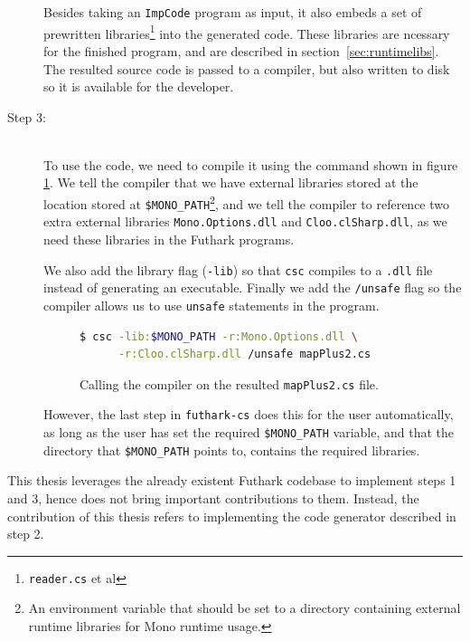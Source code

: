 \begin{description}
Besides taking an \texttt{ImpCode} program as input, it also embeds a set of
prewritten \csharp{} libraries\footnote{\texttt{reader.cs} et al} into the generated \csharp{} code. These
libraries are ncessary for the finished \csharp{} program, and are described in
section~\ref{sec:runtimelibs}.\\
The resulted \csharp{} source code is passed to a \csharp{} compiler, but also
written to disk so it is available for the developer.

\item[Step 3:]\hfill\\
  To use the \csharp{} code, we need to compile it using the command shown in
  figure \ref{fig:callcsc}. We tell the compiler that we have external libraries
  stored at the location stored at \texttt{\$MONO\_PATH}\footnote{An environment
  variable that should be set to a directory containing external runtime
  libraries for Mono runtime usage.}, and we tell the compiler to
  reference two extra external libraries \texttt{Mono.Options.dll} and
  \texttt{Cloo.clSharp.dll}, as we need these libraries in the Futhark \csharp{} programs.

  We also add the library flag ({\tt -lib}) so that \texttt{csc} compiles to a \texttt{.dll} file instead of
  generating an executable. Finally we add the \texttt{/unsafe} flag so the
  compiler allows us to use \texttt{unsafe} statements in the \csharp{} program.

\begin{figure}[H]
  \centering
  \begin{lstlisting}[language=sh]
$ csc -lib:$MONO_PATH -r:Mono.Options.dll \
      -r:Cloo.clSharp.dll /unsafe mapPlus2.cs
  \end{lstlisting}
  \caption{Calling the \csharp{} compiler on the resulted {\tt mapPlus2.cs} file.}
  \label{fig:callcsc}
\end{figure}

However, the last step in \texttt{futhark-cs} does this for the user
automatically, as long as the user has set the required \texttt{\$MONO\_PATH}
variable, and that the directory that \texttt{\$MONO\_PATH} points to, contains the
required libraries.

\end{description}

This thesis leverages the already existent Futhark codebase to implement 
steps 1 and 3, hence does not bring important contributions to them. 
Instead, the contribution of this thesis refers to implementing the 
code generator described in step 2.

